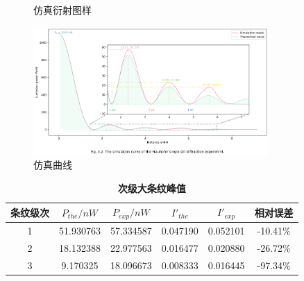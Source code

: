 \documentclass[12pt,a4paper,UTF8]{ctexart}
\begin{document}
\begin{figure}[htbp]
	\centering
	\caption{仿真衍射图样}
	\label{fig:3.1}
\end{figure}

\begin{figure}[htbp]
	\centering
	\includegraphics[width=0.8\textwidth]{attachments//Fig.3.2.png}
	\caption{仿真曲线}
	\label{fig:3.2}
\end{figure}

\begin{table}[htbp]
	\centering
	\begin{tabular}{cccccc}
	\toprule
	条纹级次 &$P_{the}/nW$ &$P_{exp}/nW$ &$I'_{the}$ &$I'_{exp}$ &相对误差 \\
	\midrule
	1  &51.930763  &57.334587  &0.047190  &0.052101  &-10.41\%	\\	
	2  &18.132388  &22.977563  &0.016477  &0.020880  &-26.72\%	\\
	3  & 9.170325  &18.096673  &0.008333  &0.016445  &-97.34\%	\\
	\bottomrule
    \end{tabular}
	\caption{\textbf{次级大条纹峰值}}
	\label{tab:3.1}
\end{table}
\end{document}
